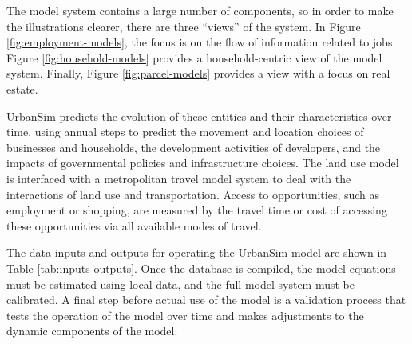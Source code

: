 The model system contains a large number of components, so in order to make the illustrations clearer, there are three \enquote{views} of the system. In Figure \ref{fig:employment-models}, the focus is on the flow of information related to jobs. Figure \ref{fig:household-models} provides a household-centric view of the model system. Finally, Figure \ref{fig:parcel-models} provides a view with a focus on real estate.

UrbanSim predicts the evolution of these entities and their characteristics over time, using annual steps to predict the movement and location choices of businesses and households, the development activities of developers, and the impacts of governmental policies and infrastructure choices. The land use model is interfaced with a metropolitan travel model system to deal with the interactions of land use and transportation. Access to opportunities, such as employment or shopping, are measured by the travel time or cost of accessing these opportunities via all available modes of travel.

The data inputs and outputs for operating the UrbanSim model are shown in Table \ref{tab:inputs-outputs}. Once the database is compiled, the model equations must be estimated using local data, and the full model system must be calibrated. A final step before actual use of the model is a validation process that tests the operation of the model over time and makes adjustments to the dynamic components of the model. 

